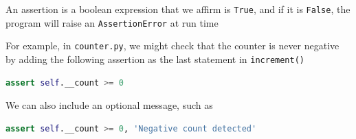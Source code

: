 \documentclass[8pt,a4paper,compress]{beamer}
\begin{document}
\begin{frame}[fragile]
\pause

An assertion is a boolean expression that we affirm is \lstinline{True}, and if it is \lstinline{False}, the program will raise an \lstinline{AssertionError} at run time

\pause
\bigskip

For example, in \lstinline{counter.py}, we might check that the counter is never negative by adding the following assertion as the last statement in \lstinline{increment()}
\begin{lstlisting}[language=Python,style=focusin]
assert self.__count >= 0
\end{lstlisting} 

\pause
\bigskip

We can also include an optional message, such as
\begin{lstlisting}[language=Python,style=focusin]
assert self.__count >= 0, 'Negative count detected'
\end{lstlisting} 
\end{frame}
\end{document}
